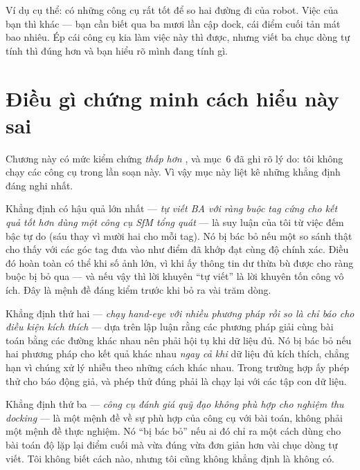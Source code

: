 \documentclass[../../marker.tex]{subfiles}
\begin{document}
\begin{dongian}
Ví dụ cụ thể: có những công cụ rất tốt để so hai đường đi của robot. Việc của bạn thì khác --- bạn cần biết qua ba mươi lần cập dock, cái điểm cuối tản mát bao nhiêu. Ép cái công cụ kia làm việc này thì được, nhưng viết ba chục dòng tự tính thì đúng hơn và bạn hiểu rõ mình đang tính gì.

\end{dongian}

\section{Điều gì chứng minh cách hiểu này sai}

Chương này có mức kiểm chứng \emph{thấp hơn} , và mục~6 đã ghi rõ lý
do: tôi không chạy các công cụ trong lần soạn này. Vì vậy mục này liệt kê những
khẳng định đáng nghi nhất.

Khẳng định có hậu quả lớn nhất --- \emph{tự viết BA với ràng buộc tag cứng cho
kết quả tốt hơn dùng một công cụ SfM tổng quát} --- là suy luận của tôi từ việc
đếm bậc tự do (sáu thay vì mười hai cho mỗi tag). Nó bị bác bỏ nếu một so sánh
thật cho thấy  với các góc tag đưa vào như điểm đã khớp đạt cùng độ
chính xác. Điều đó hoàn toàn có thể khi số ảnh lớn, vì khi ấy thông tin dư thừa
bù được cho ràng buộc bị bỏ qua --- và nếu vậy thì lời khuyên ``tự viết'' là lời
khuyên tốn công vô ích. Đây là mệnh đề đáng kiểm trước khi bỏ ra vài trăm dòng.

Khẳng định thứ hai --- \emph{chạy hand-eye với nhiều phương pháp rồi so là chỉ
báo cho điều kiện kích thích} --- dựa trên lập luận rằng các phương pháp giải
cùng bài toán bằng các đường khác nhau nên phải hội tụ khi dữ liệu đủ. Nó bị bác
bỏ nếu hai phương pháp cho kết quả khác nhau \emph{ngay cả khi} dữ liệu đủ kích
thích, chẳng hạn vì chúng xử lý nhiễu theo những cách khác nhau. Trong trường hợp
ấy phép thử cho báo động giả, và phép thử đúng phải là chạy lại với các tập con
dữ liệu.

Khẳng định thứ ba --- \emph{công cụ đánh giá quỹ đạo không phù hợp cho nghiệm thu
docking} --- là một mệnh đề về sự phù hợp của công cụ với bài toán, không phải
một mệnh đề thực nghiệm. Nó ``bị bác bỏ'' nếu ai đó chỉ ra một cách dùng
 cho bài toán độ lặp lại điểm cuối mà vừa đúng vừa đơn giản hơn vài
chục dòng tự viết. Tôi không biết cách nào, nhưng tôi cũng không khẳng định là
không có.
\end{document}
